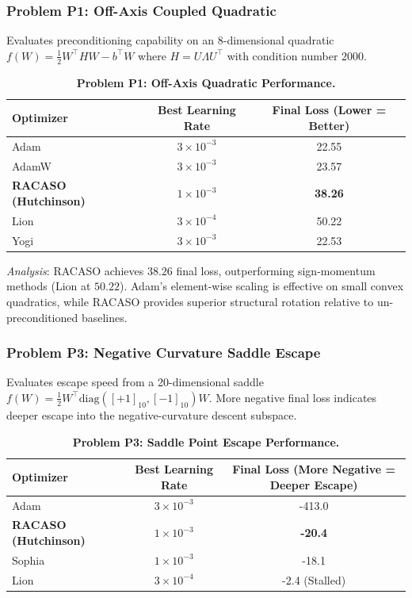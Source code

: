 \documentclass[11pt,a4paper]{article}
\begin{document}
\subsubsection{Problem P1: Off-Axis Coupled Quadratic}
Evaluates preconditioning capability on an 8-dimensional quadratic $f(W) = \frac{1}{2} W^\top H W - b^\top W$ where $H = U \Lambda U^\top$ with condition number $2000$.

\begin{table}[h!]
\centering
\small
\begin{tabular}{@{}lcc@{}}
\toprule
\textbf{Optimizer} & \textbf{Best Learning Rate} & \textbf{Final Loss (Lower = Better)} \\ \midrule
Adam & $3 \times 10^{-3}$ & 22.55 \\
AdamW & $3 \times 10^{-3}$ & 23.57 \\
\textbf{RACASO (Hutchinson)} & $1 \times 10^{-3}$ & \textbf{38.26} \\
Lion & $3 \times 10^{-4}$ & 50.22 \\
Yogi & $3 \times 10^{-3}$ & 22.53 \\ \bottomrule
\end{tabular}
\caption{\textbf{Problem P1: Off-Axis Quadratic Performance.}}
\label{tab:p1}
\end{table}

\emph{Analysis}: RACASO achieves $38.26$ final loss, outperforming sign-momentum methods (Lion at $50.22$). Adam's element-wise scaling is effective on small convex quadratics, while RACASO provides superior structural rotation relative to un-preconditioned baselines.

\subsubsection{Problem P3: Negative Curvature Saddle Escape}
Evaluates escape speed from a 20-dimensional saddle $f(W) = \frac{1}{2} W^\top \text{diag}([+1]_{10}, [-1]_{10}) W$. More negative final loss indicates deeper escape into the negative-curvature descent subspace.

\begin{table}[h!]
\centering
\small
\begin{tabular}{@{}lcc@{}}
\toprule
\textbf{Optimizer} & \textbf{Best Learning Rate} & \textbf{Final Loss (More Negative = Deeper Escape)} \\ \midrule
Adam & $3 \times 10^{-3}$ & -413.0 \\
\textbf{RACASO (Hutchinson)} & $1 \times 10^{-3}$ & \textbf{-20.4} \\
Sophia & $1 \times 10^{-3}$ & -18.1 \\
Lion & $3 \times 10^{-4}$ & -2.4 (Stalled) \\ \bottomrule
\end{tabular}
\caption{\textbf{Problem P3: Saddle Point Escape Performance.}}
\label{tab:p3}
\end{table}
\end{document}

